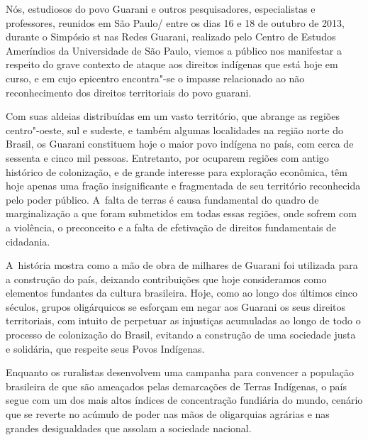 
Nós, estudiosos do povo Guarani e outros pesquisadores, especialistas e
professores, reunidos em São Paulo/ entre os dias 16 e 18 de outubro
de 2013, durante o Simpósio st nas Redes Guarani, realizado pelo
Centro de Estudos Ameríndios da Universidade de São Paulo, viemos a
público nos manifestar a respeito do grave contexto de ataque aos
direitos indígenas que está hoje em curso, e em cujo epicentro
encontra"-se o impasse relacionado ao não reconhecimento dos direitos
territoriais do povo guarani.

Com suas aldeias distribuídas em um vasto território, que abrange as
regiões centro"-oeste, sul e sudeste, e também algumas localidades na
região norte do Brasil, os Guarani constituem hoje o maior povo
indígena no país, com cerca de sessenta e cinco mil pessoas.
Entretanto, por ocuparem regiões com antigo histórico de colonização, e
de grande interesse para exploração econômica, têm hoje apenas uma
fração insignificante e fragmentada de seu território reconhecida pelo
poder público. A~falta de terras é causa fundamental do quadro de
marginalização a que foram submetidos em todas essas regiões, onde
sofrem com a violência, o preconceito e a falta de efetivação de
direitos fundamentais de cidadania. 

A~história mostra como a mão de obra de milhares de Guarani foi
utilizada para a construção do país, deixando contribuições que hoje
consideramos como elementos fundantes da cultura brasileira. Hoje, como
ao longo dos últimos cinco séculos, grupos oligárquicos se esforçam em
negar aos Guarani os seus direitos territoriais, com intuito de
perpetuar as injustiças acumuladas ao longo de todo o processo de
colonização do Brasil, evitando a construção de uma sociedade justa e
solidária, que respeite seus Povos Indígenas.

Enquanto os ruralistas desenvolvem uma campanha para convencer a
população brasileira de que são ameaçados pelas demarcações de Terras
Indígenas, o país segue com um dos mais altos índices de concentração
fundiária do mundo, cenário que se reverte no acúmulo de poder nas mãos
de oligarquias agrárias e nas grandes desigualdades que assolam a
sociedade nacional. 

